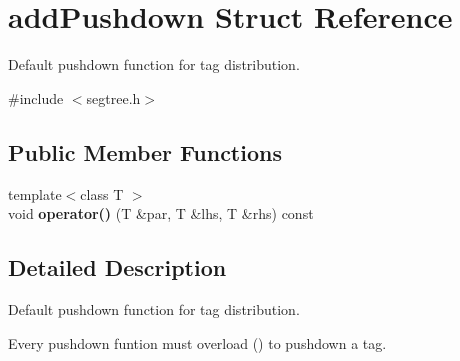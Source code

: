 \hypertarget{structadd_pushdown}{}\section{add\+Pushdown Struct Reference}
\label{structadd_pushdown}


Default pushdown function for tag distribution.  




{\ttfamily \#include $<$segtree.\+h$>$}

\subsection*{Public Member Functions}
\begin{DoxyCompactItemize}
\item 
\mbox{\label{structadd_pushdown_af0771f1ca8038eab4860d6d883bf7ab5}} 
{\footnotesize template$<$class T $>$ }\\void {\bfseries operator()} (T \&par, T \&lhs, T \&rhs) const
\end{DoxyCompactItemize}


\subsection{Detailed Description}
Default pushdown function for tag distribution. 

Every pushdown funtion must overload () to pushdown a tag. 